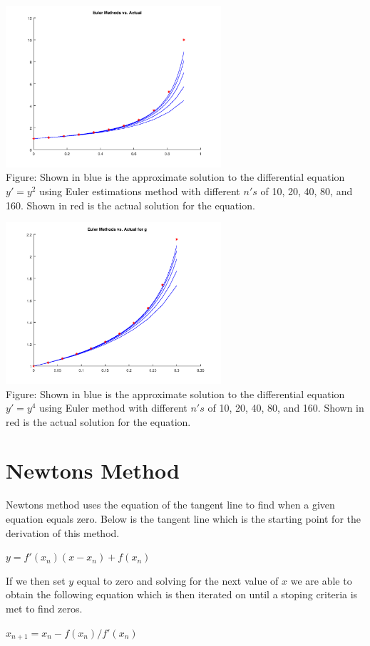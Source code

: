 \documentclass{article}
\begin{document}
\includegraphics[height=6cm]{problem2_f}\\
Figure: Shown in blue is the approximate solution to the differential equation $y' = y^2$ using Euler estimations method with different $n's$ of 10, 20, 40, 80, and 160. Shown in red is the actual solution for the equation.

\includegraphics[height=6cm]{problem2_g}\\
Figure: Shown in blue is the approximate solution to the differential equation $y' = y^4$ using Euler method with different $n's$ of 10, 20, 40, 80, and 160. Shown in red is the actual solution for the equation.


\section{Newtons Method}
Newtons method uses the equation of the tangent line to find when a given equation equals zero. Below is the tangent line which is the starting point for the derivation of this method. 

	$ y = f'(x_n)(x - x_n) + f(x_n)$

If we then set $y$ equal to zero and solving for the next value of $x$ we are able to obtain the following equation which is then iterated on until a stoping criteria is met to find zeros.

	$ x_{n+1} = x_n - f(x_n) / f'(x_n) $
\end{document}
